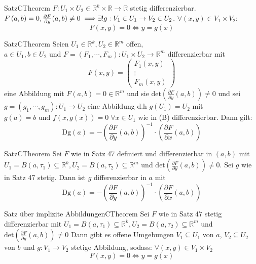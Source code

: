 %
%
\begin{ibox}[46]{Satz}{CTheorem}
    $ F: U_1 \times U_2 \in \mathbb{R}^{k} \times \mathbb{R}  \to \mathbb{R}  $ stetig differenzierbar. $ F \left( a,b \right) = 0, 
		\frac{\partial F}{\partial y} (a,b) \neq 0 \implies\\  \exists!  g  : V_1 \in U_1 \to V_2 \in U_2$. 
		$ \forall (x,y) \in V_1 \times V_2$:
		$$ F (x,y) = 0 \iff y = g (x)  $$
\end{ibox}
\begin{ibox}[47]{Satz}{CTheorem}
	Seien $ U_1 \in \mathbb{R}^k, U_2 \in \mathbb{R}^m  $ offen, $ a \in U_1, b \in  U_2 \text{ und }  F = \left( F_1 , \cdots,  F_m \right) 
	: U_1 \times U_2 \to \mathbb{R}^m $ differenzierbar mit 
	$$ F (x,y) = \begin{pmatrix}
		F_1 (x,y) \\
		\vdots \\
		F_m (x,y) 
	\end{pmatrix}$$
	eine Abbildung mit $ F (a,b) = 0 \in \mathbb{R}^m  $ 
	 und sie $ \text{det} \left( \frac{\partial F}{\partial y } (a,b) \right) \neq 0 $ und sei $ g  = \left( g_1 , \cdots,  g_{m} \right): 
	 U_1 \to U_2$ eine Abbildung d.h $ g (U_1) = U_2 $ mit $ g(a) = b \text{ und } f \left( x, g (x)  \right) = 0 \; \forall x \in U_1 $ 
	wie in (B) differenzierbar. Dann gilt:
	$$
	\text{Dg} (a) = - \left( \frac{\partial F}{\partial y} (a,b)  \right)^{-1} \cdot \left( \frac{\partial F}{\partial x} (a,b)  \right) 
	$$
\end{ibox}
\begin{ibox}[48]{Satz}{CTheorem}
	Sei $ F $ wie in Satz 47 definiert und  differenzierbar in $ (a,b)  $ mit $ U_1 = B (a, \tau_1) \subseteq \mathbb{R}^{k}, U_2 = B (a, \tau
	_2) \subseteq \mathbb{R}^{m} $ und $ \text{det} \left( \frac{\partial F}{\partial y} (a,b)  \right) \neq 0 $. Sei $ g $ wie in Satz 47 
	stetig. Dann ist 
	$ g $ differenzierbar in $ a $ mit 
	$$ \text{Dg} (a) = - \left( \frac{\partial F}{\partial y} (a,b)  \right) ^{-1} \cdot \left( \frac{\partial F}{\partial x}(a,b)\right)$$
\end{ibox}
\begin{ibox}[49]{Satz über implizite Abbildungen}{CTheorem}
    Sei $ F $ wie in Satz 47 stetig differenzierbar mit $  U_1 = B (a, \tau_1) \subseteq \mathbb{R}^{k}, U_2 = B (a, \tau_2) 
		\subseteq \mathbb{R}^{m} $ und $ \text{det} \left( \frac{\partial F}{\partial y } (a,b)  \right) \neq 0  $  
		Dann gibt es offene Umgebungen $ V_1 \subseteq U_1 $ von $ a $, $ V_2 \subseteq U_2 $ von $ b $ und $ g: V_1 \to V_2 $ stetige 
		Abbildung, sodass: $ \forall (x,y) \in V_1 \times V_2 $ 
		$$ F (x,y) = 0 \iff y = g (x)  $$
\end{ibox}

